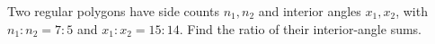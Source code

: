 Two regular polygons have side counts $ n_1,n_2 $ and interior angles $ x_1,x_2 $, with $ n_1:n_2=7:5 $ and $ x_1:x_2=15:14 $. Find the ratio of their interior-angle sums.
